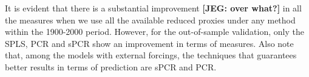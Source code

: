 \documentclass[11pt]{amsart}
\theoremstyle{plain}
\theoremstyle{definition}
\theoremstyle{remark}
\newcommand{\jeg}[1]{\color{ProcessBlue}\textbf{[JEG: #1]}\normalcolor}
\begin{document}
It is evident that there is a substantial improvement \jeg{over what?}
in all the measures when we use all the available reduced proxies under any
method within the 1900-2000 period. However, for the out-of-sample validation, only
the SPLS, PCR and sPCR show an improvement in terms of measures.  Also note that, among the models with external forcings, the techniques that
guarantees better results in terms of prediction are sPCR and PCR.
\end{document}
